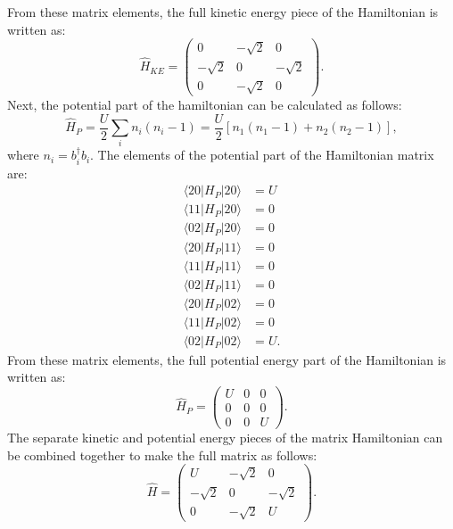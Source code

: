 \noindent From these matrix elements, the full kinetic energy piece of the Hamiltonian is written as:
\begin{equation}
\hat{H}_{KE} = \begin{pmatrix} 0 & -\sqrt{2} & 0 \\ -\sqrt{2} & 0 & -\sqrt{2} \\ 0 & -\sqrt{2} & 0 \end{pmatrix}.
\end{equation}
\noindent Next, the potential part of the hamiltonian can be calculated as follows:
\begin{equation}
\hat{H}_{P} = \frac{U}{2}\sum_i{n_i(n_i - 1)} = \frac{U}{2}[n_1(n_1 - 1) + n_2(n_2 - 1)],
\end{equation}
\noindent where $n_i = b_i^{\dagger}b_i$. The elements of the potential part of the Hamiltonian matrix are:
\begin{align*}
\langle{20|H_{P}|20\rangle} &=U \\
\langle{11|H_{P}|20\rangle} &=0 \\
\langle{02|H_{P}|20\rangle} &=0 \\
\langle{20|H_{P}|11\rangle} &=0 \\
\langle{11|H_{P}|11\rangle} &=0 \\
\langle{02|H_{P}|11\rangle} &=0 \\
\langle{20|H_{P}|02\rangle} &=0 \\
\langle{11|H_{P}|02\rangle} &=0 \\
\langle{02|H_{P}|02\rangle} &=U.
\end{align*}
\noindent From these matrix elements, the full potential energy part of the Hamiltonian is written as:
\begin{equation}
\hat{H}_{P} = \begin{pmatrix} U & 0 & 0 \\ 0 & 0 & 0 \\ 0 & 0 & U \end{pmatrix}.
\end{equation}
\noindent The separate kinetic and potential energy pieces of the matrix Hamiltonian can be combined together to make the full matrix as follows:
\begin{equation}
\hat{H} = \begin{pmatrix} U & -\sqrt{2} & 0 \\ -\sqrt{2} & 0 & -\sqrt{2} \\ 0 & -\sqrt{2} & U \end{pmatrix}.
\end{equation}
